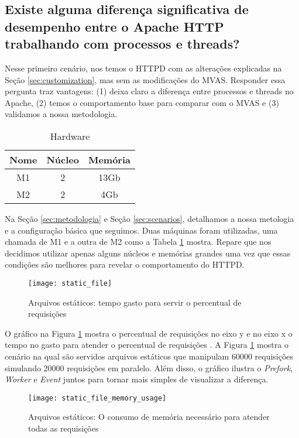 \subsection{Existe alguma diferença significativa de desempenho entre o Apache
HTTP trabalhando com processos e threads?}

Nesse primeiro cenário, nos temos o HTTPD com as alterações explicadas na Seção
\ref{sec:customization}, mas sem as modificações do MVAS. Responder essa
pergunta traz vantagens: (1) deixa claro a diferença entre processos e threads
no Apache, (2) temos o comportamento base para comparar com o MVAS e (3)
validamos a nossa metodologia.

\begin{table}[h!] \centering \begin{tabular}{|c|c|c|} \hline Nome &
\textbf{Núcleo} & \textbf{Memória}\\ \hline M1 & 2 & 13Gb \\ \hline M2 & 2 &
4Gb \\ \hline \end{tabular} \caption{Hardware} \label{tab:machines} \end{table}

Na Seção \ref{sec:metodologia} e Seção \ref{sec:scenarios}, detalhamos a nossa
metologia e a configuração básica que seguimos. Duas máquinas foram utilizadas,
uma chamada de M1 e a outra de M2 como a Tabela \ref{tab:machines} mostra.
Repare que nos decidimos utilizar apenas alguns núcleos e memórias grandes uma
vez que essas condições são melhores para revelar o comportamento do HTTPD.

\begin{figure}[!h] \centering
\texttt{[image: static\_file]} \caption{Arquivos estáticos:
tempo gasto para servir o percentual de requisições} \label{fig:static_file}
\end{figure}

O gráfico na Figura \ref{fig:static_file} mostra o percentual de requisições no
eixo y e no eixo x o tempo no gasto para atender o percentual de requisições
\citep{apache_ab}. A Figura \ref{fig:static_file} mostra o cenário na qual são
servidos arquivos estáticos que manipulam 60000 requisições simulando 20000
requisições em paralelo. Além disso, o gráfico ilustra o \emph{Prefork},
\emph{Worker} e \emph{Event} juntos para tornar mais simples de visualizar a
diferença.

\begin{figure}[!h] \centering
\texttt{[image: static\_file\_memory\_usage]}
\caption{Arquivos estáticos: O consumo de memória necessário para atender todas
as requisições} \label{fig:static_file_memory} \end{figure}
 
